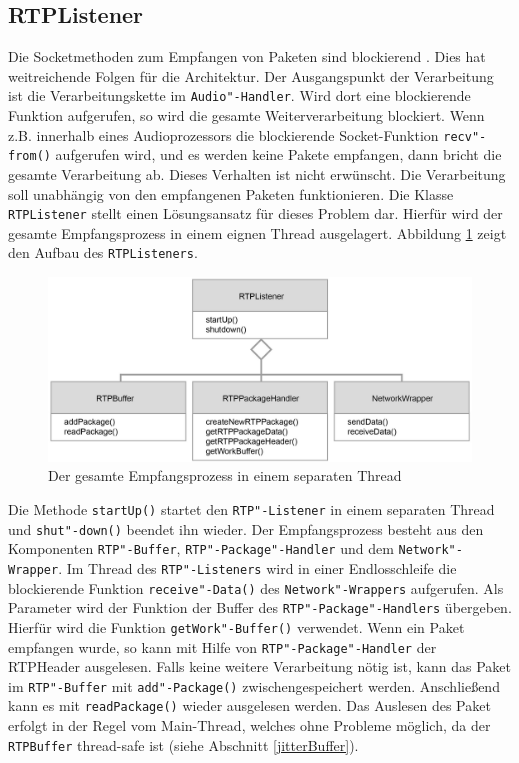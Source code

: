 \FloatBarrier
\subsection{RTPListener}
\label{rtpListener}
Die Socketmethoden zum Empfangen von Paketen sind blockierend \cite{WinsockReference}. Dies hat weitreichende Folgen für die Architektur. Der Ausgangspunkt der Verarbeitung ist die Verarbeitungskette im \texttt{Audio"-Handler}. Wird dort eine blockierende Funktion aufgerufen, so wird die gesamte Weiterverarbeitung blockiert. Wenn z.B. innerhalb eines Audioprozessors die blockierende Socket-Funktion \texttt{recv"-from()} aufgerufen wird, und es werden keine Pakete empfangen, dann bricht die gesamte Verarbeitung ab. Dieses Verhalten ist nicht erwünscht. Die Verarbeitung soll unabhängig von den empfangenen Paketen funktionieren. Die Klasse \texttt{RTPListener} stellt einen Lösungsansatz für dieses Problem dar. Hierfür wird der gesamte Empfangsprozess in einem eignen Thread ausgelagert. Abbildung \ref{Fig:RTPListenerAdvanced} zeigt den Aufbau des \texttt{RTPListeners}.
\newline
\begin{figure}[htp]
\centering
\includegraphics[width=1\textwidth]{../img/RTPListenerAdvanced}
\caption{Der gesamte Empfangsprozess in einem separaten Thread}
\label{Fig:RTPListenerAdvanced}
\end{figure}

Die Methode \texttt{startUp()} startet den \texttt{RTP"-Listener} in einem separaten Thread und \texttt{shut"-down()} beendet ihn wieder. Der Empfangsprozess besteht aus den Komponenten \texttt{RTP"-Buffer}, \texttt{RTP"-Package"-Handler} und dem \texttt{Network"-Wrapper}. Im Thread des \texttt{RTP"-Listeners} wird in einer Endlosschleife die blockierende Funktion \texttt{receive"-Data()} des \texttt{Network"-Wrappers} aufgerufen. Als Parameter wird der Funktion der Buffer des \texttt{RTP"-Package"-Handlers} übergeben. Hierfür wird die Funktion \texttt{getWork"-Buffer()} verwendet. Wenn ein Paket empfangen wurde, so kann mit Hilfe von \texttt{RTP"-Package"-Handler} der RTPHeader ausgelesen. Falls keine weitere Verarbeitung nötig ist, kann das Paket im \texttt{RTP"-Buffer} mit \texttt{add"-Package()} zwischengespeichert werden. Anschließend kann es mit \texttt{readPackage()} wieder ausgelesen werden. Das Auslesen des Paket erfolgt in der Regel vom Main-Thread, welches ohne Probleme möglich, da der \texttt{RTPBuffer} thread-safe ist (siehe Abschnitt \ref{jitterBuffer}).


